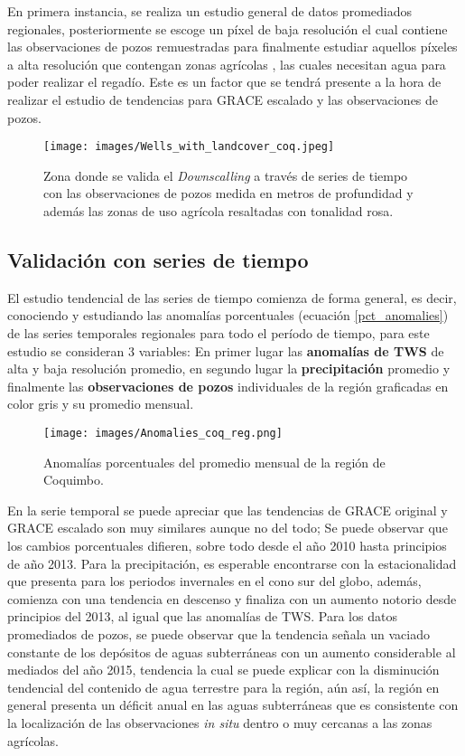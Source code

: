 En primera instancia, se realiza un estudio general de datos promediados regionales, 
posteriormente se escoge un píxel de baja resolución el cual contiene las observaciones de pozos remuestradas para finalmente estudiar aquellos píxeles a alta resolución que contengan zonas agrícolas \cite{LC}, las cuales necesitan agua para 
poder realizar el regadío. Este es un factor que se tendrá presente a la hora de realizar el estudio de tendencias para GRACE escalado y las observaciones de pozos.

\begin{figure}[H]
    \centering
          \texttt{[image: images/Wells\_with\_landcover\_coq.jpeg]}
          \vskip -0.1in
    \caption[Zona de validación con series de tiempo]{\footnotesize Zona donde se valida el \textit{Downscalling} a través de series de tiempo con las observaciones de pozos medida en metros de profundidad y además las zonas de uso agrícola resaltadas con tonalidad rosa.}
    \label{szcoq}
\end{figure}

\subsection{Validación con series de tiempo}
El estudio tendencial de las series de tiempo comienza de forma general, es decir, conociendo y estudiando las anomalías porcentuales (ecuación \ref{pct_anomalies}) de las series temporales regionales para todo el período de tiempo, para este estudio se consideran 3 variables: En primer lugar las \textbf{anomalías de TWS} de alta y baja resolución promedio, en segundo lugar la 
\textbf{precipitación} promedio y finalmente las \textbf{observaciones de pozos} individuales de la región graficadas en color gris y su promedio mensual.

\begin{figure}[H]
    \centering
          \texttt{[image: images/Anomalies\_coq\_reg.png]}
          \vskip -0.1in
    \caption[Series de tiempo para la región de Coquimbo]{\footnotesize Anomalías porcentuales del promedio mensual de la región de Coquimbo.}
    \label{tscoq}
\end{figure}
En la serie temporal se puede apreciar que las tendencias de GRACE original y GRACE escalado son muy similares aunque no del todo; Se puede observar que los cambios porcentuales difieren, sobre todo desde el año 2010 hasta principios de año 2013. Para la precipitación,
es esperable encontrarse con la estacionalidad que presenta para los periodos invernales en el cono sur del globo, además, comienza con una tendencia en descenso y finaliza con un aumento notorio desde principios del 2013, al igual que las anomalías de TWS. Para los datos promediados de pozos, 
se puede observar que la tendencia señala un vaciado constante de los depósitos de aguas subterráneas con un aumento considerable al mediados del año 2015, tendencia la cual se puede explicar con la disminución tendencial del contenido de 
agua terrestre para la región, aún así, la región en general presenta un déficit anual en las aguas subterráneas que es consistente con la localización de las observaciones \textit{in situ} dentro o muy cercanas a las zonas agrícolas. 

